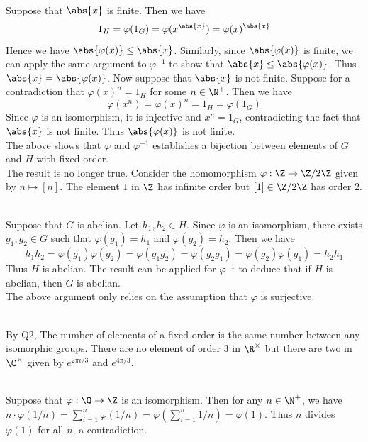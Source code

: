 \documentclass[a4paper]{article}
\begin{document}
\begin{ex}{}{}\\
Suppose that $\abs{x}$ is finite. Then we have $$1_H=\varphi(1_G)=\varphi(x^\abs{x})=\varphi(x)^\abs{x}$$ Hence we have $\abs{\varphi(x)}\leq\abs{x}$. Similarly, since $\abs{\varphi(x)}$ is finite, we can apply the same argument to $\varphi^{-1}$ to show that $\abs{x}\leq\abs{\varphi(x)}$. Thus $\abs{x}=\abs{\varphi(x)}$. Now suppose that $\abs{x}$ is not finite. Suppose for a contradiction that $\varphi(x)^n=1_H$ for some $n\in\N^+$. Then we have $$\varphi(x^n)=\varphi(x)^n=1_H=\varphi(1_G)$$ Since $\varphi$ is an isomorphism, it is injective and $x^n=1_G$, contradicting the fact that $\abs{x}$ is not finite. Thus $\abs{\varphi(x)}$ is not finite. \\

The above shows that $\varphi$ and $\varphi^{-1}$ establishes a bijection between elements of $G$ and $H$ with fixed order. \\

The result is no longer true. Consider the homomorphism $\varphi:\Z\to\Z/2\Z$ given by $n\mapsto[n]$. The element $1$ in $\Z$ has infinite order but $[1]\in\Z/2\Z$ has order $2$. 
\end{ex}

\begin{ex}{}{}\\
Suppose that $G$ is abelian. Let $h_1,h_2\in H$. Since $\varphi$ is an isomorphism, there exists $g_1,g_2\in G$ such that $\varphi(g_1)=h_1$ and $\varphi(g_2)=h_2$. Then we have $$h_1h_2=\varphi(g_1)\varphi(g_2)=\varphi(g_1g_2)=\varphi(g_2g_1)=\varphi(g_2)\varphi(g_1)=h_2h_1$$ Thus $H$ is abelian. The result can be applied for $\varphi^{-1}$ to deduce that if $H$ is abelian, then $G$ is abelian. \\

The above argument only relies on the assumption that $\varphi$ is surjective. 
\end{ex}

\begin{ex}{}{}\\
By Q2, The number of elements of a fixed order is the same number between any isomorphic groups. There are no element of order $3$ in $\R^\times$ but there are two in $\C^\times$ given by $e^{2\pi i/3}$ and $e^{4\pi/3}$. 
\end{ex}

\begin{ex}{}{}\\
Suppose that $\varphi:\Q\to\Z$ is an isomorphism. Then for any $n\in\N^+$, we have $n\cdot\varphi(1/n)=\sum_{i=1}^n\varphi(1/n)=\varphi\left(\sum_{i=1}^n1/n\right)=\varphi(1)$. Thus $n$ divides $\varphi(1)$ for all $n$, a contradiction. 
\end{ex}
\end{document}
